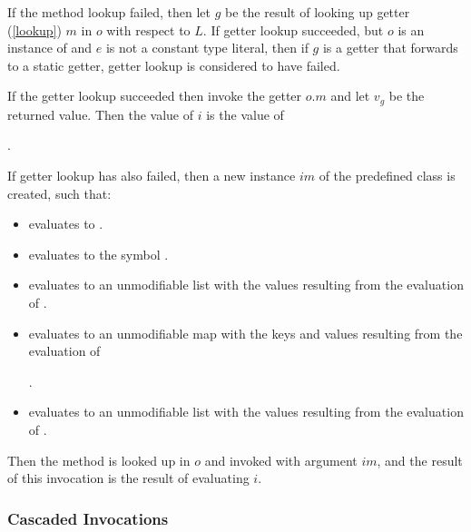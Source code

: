 \documentclass[makeidx]{article}
\begin{document}
\LMHash{}%
If the method lookup failed,
then let $g$ be the result of looking up getter (\ref{lookup}) $m$ in $o$ with respect to $L$.
If getter lookup succeeded,
but $o$ is an instance of  and $e$ is not a constant type literal,
then if $g$ is a getter that forwards to a static getter,
getter lookup is considered to have failed.

\LMHash{}%
If the getter lookup succeeded then invoke the getter $o.m$
and let $v_g$ be the returned value.
Then the value of $i$ is the value of

.

\LMHash{}%
If getter lookup has also failed,
then a new instance $im$ of the predefined class  is created, such that:
\begin{itemize}
\item {} evaluates to \code{\TRUE{}}.
\item {} evaluates to the symbol .
\item {} evaluates to an unmodifiable list
  with the values resulting from the evaluation of
  .
\item {} evaluates to an unmodifiable map
  with the keys and values resulting from the evaluation of

  .
\item {} evaluates to an unmodifiable list
  with the values resulting from the evaluation of
  .
\end{itemize}

\LMHash{}%
Then the method  is looked up in $o$ and invoked with argument $im$,
and the result of this invocation is the result of evaluating $i$.



\subsubsection{Cascaded Invocations}
\end{document}
